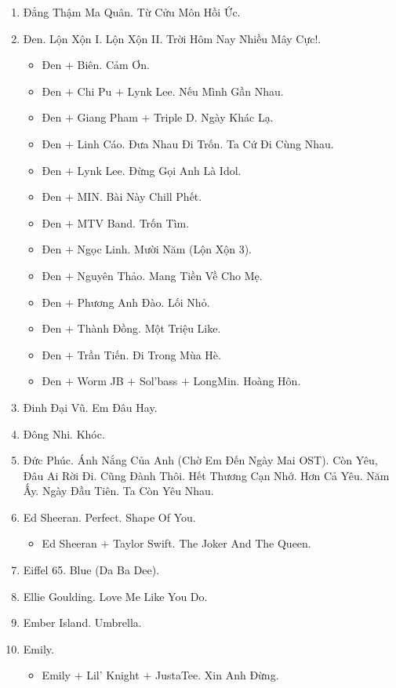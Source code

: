 \documentclass{article}
\begin{document}
\begin{enumerate}
	\item {\sc Đẳng Thậm Ma Quân.} Từ Cửu Môn Hồi Ức.
	\item {\sc Đen.} Lộn Xộn I. Lộn Xộn II. Trời Hôm Nay Nhiều Mây Cực!. 
	\begin{itemize}
		\item {\sc Đen $+$ Biên.} Cảm Ơn.
		\item {\sc Đen $+$ Chi Pu $+$ Lynk Lee.} Nếu Mình Gần Nhau.
		\item {\sc Đen $+$ Giang Pham $+$ Triple D.} Ngày Khác Lạ.
		\item {\sc Đen $+$ Linh Cáo.} Đưa Nhau Đi Trốn. Ta Cứ Đi Cùng Nhau.
		\item {\sc Đen $+$ Lynk Lee.} Đừng Gọi Anh Là Idol.
		\item {\sc Đen $+$ MIN.} Bài Này Chill Phết.
		\item {\sc Đen $+$ MTV Band.} Trốn Tìm.
		\item {\sc Đen $+$ Ngọc Linh.} Mười Năm (Lộn Xộn 3).
		\item {\sc Đen $+$ Nguyên Thảo.} Mang Tiền Về Cho Mẹ.
		\item {\sc Đen $+$ Phương Anh Đào.} Lối Nhỏ.
		\item {\sc Đen $+$ Thành Đồng.} Một Triệu Like.
		\item {\sc Đen $+$ Trần Tiến.} Đi Trong Mùa Hè.
		\item {\sc Đen $+$ Worm JB $+$ Sol'bass $+$ LongMin.} Hoàng Hôn.
	\end{itemize}
	\item {\sc Đinh Đại Vũ.} Em Đâu Hay.
	\item {\sc Đông Nhi.} Khóc.
	\item {\sc Đức Phúc.} Ánh Nắng Của Anh (Chờ Em Đến Ngày Mai OST). Còn Yêu, Đâu Ai Rời Đi. Cũng Đành Thôi. Hết Thương Cạn Nhớ. Hơn Cả Yêu. Năm Ấy. Ngày Đầu Tiên. Ta Còn Yêu Nhau.
	\item {\sc Ed Sheeran.} Perfect. Shape Of You.
	\begin{itemize}
		\item {\sc Ed Sheeran $+$ Taylor Swift.} The Joker And The Queen.
	\end{itemize}
	\item {\sc Eiffel 65.} Blue (Da Ba Dee).
	\item {\sc Ellie Goulding.} Love Me Like You Do.
	\item {\sc Ember Island.} Umbrella.
	\item {\sc Emily.}
	\begin{itemize}
		\item {\sc Emily $+$ Lil' Knight $+$ JustaTee.} Xin Anh Đừng.

\end{itemize}
\end{enumerate}
\end{document}
